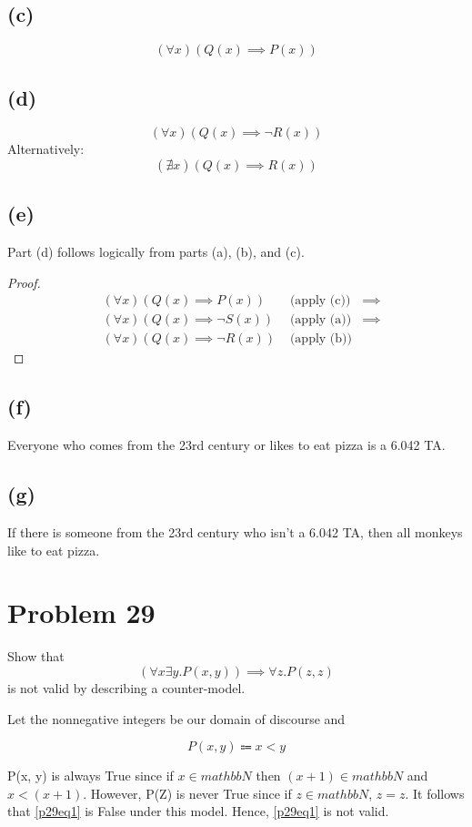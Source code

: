 \documentclass{article}
\begin{document}
\subsection{(c)}
\[
	(\forall x)(Q(x) \implies P(x))
\]
\subsection{(d)}
\[
	(\forall x)(Q(x) \implies \neg R(x))
\]
Alternatively:
\[
	(\nexists x)(Q(x) \implies R(x))
\]
\subsection{(e)}
Part (d) follows logically from parts (a), (b), and (c).
\begin{proof}
	\begin{align*}
		 & (\forall x)(Q(x) \implies P(x))      & \text{ (apply (c))} & \implies \\
		 & (\forall x)(Q(x) \implies \neg S(x)) & \text{ (apply (a))} & \implies \\
		 & (\forall x)(Q(x) \implies \neg R(x)) & \text{ (apply (b))}
	\end{align*}
\end{proof}

\subsection{(f)}
Everyone who comes from the 23rd century or likes to eat pizza is a 6.042 TA.

\subsection{(g)}
If there is someone from the 23rd century who isn't a 6.042 TA, then all monkeys like to eat pizza.

\pagebreak

\section{Problem 29}
Show that
\begin{equation}\label{p29eq1}
	(\forall x \exists y. P(x, y)) \implies \forall z. P(z, z)
\end{equation}
is not valid by describing a counter-model.

Let the nonnegative integers be our domain of discourse and

\[
	P(x, y) \Coloneqq x < y
\]

P(x, y) is always True since if $x \in mathbb{N}$ then $(x + 1) \in mathbb{N}$ and $x < (x + 1)$.  However, P(Z) is never True since if $z \in mathbb{N}$, $z = z$. It follows that \eqref{p29eq1} is False under this model. Hence, \eqref{p29eq1} is not valid.
\end{document}
